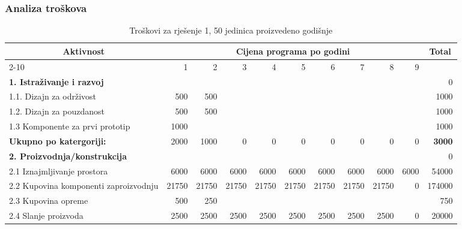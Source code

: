 \documentclass[12pt]{article}
\begin{document}
\subsubsection{Analiza troškova}
\begin{landscape}
\begin{table}[htbp]
  \centering
  \small
  \caption{Troškovi za rješenje 1, 50 jedinica proizvedeno godišnje}
    \begin{tabular}{lrrrrrrrrrr}
    \toprule
    \multicolumn{1}{c}{\multirow{2}[4]{*}{Aktivnost}} & \multicolumn{9}{c}{Cijena programa po godini}                         & \multicolumn{1}{c}{\multirow{2}[4]{*}{Total}} \\
\cmidrule{2-10}          & 1     & 2     & 3     & 4     & 5     & 6     & 7     & 8     & 9     &  \\
    \midrule
    \textbf{1. Istraživanje i razvoj} &       &       &       &       &       &       &       &       &       & 0 \\
    1.1. Dizajn za održivost & 500   & 500   &       &       &       &       &       &       &       & 1000 \\
    1.2. Dizajn za pouzdanost & 500   & 500   &       &       &       &       &       &       &       & 1000 \\
    1.3 Komponente za prvi prototip & 1000  &       &       &       &       &       &       &       &       & 1000 \\
    \midrule
    \textbf{Ukupno po katergoriji:} & 2000  & 1000  & 0     & 0     & 0     & 0     & 0     & 0     & 0     & \textbf{3000} \\
    \midrule
    \textbf{2. Proizvodnja/konstrukcija} &       &       &       &       &       &       &       &       &       & 0 \\
    2.1 Iznajmljivanje prostora & 6000  & 6000  & 6000  & 6000  & 6000  & 6000  & 6000  & 6000  & 6000  & 54000 \\
    \multicolumn{1}{p{14.715em}}{2.2 Kupovina komponenti za\newline{}proizvodnju} & 21750 & 21750 & 21750 & 21750 & 21750 & 21750 & 21750 & 21750 & 0     & 174000 \\
    2.3 Kupovina opreme & 500   & 250   &       &       &       &       &       &       &       & 750 \\
    2.4 Slanje proizvoda & 2500  & 2500  & 2500  & 2500  & 2500  & 2500  & 2500  & 2500  & 0     & 20000 \\
    \midrule

\end{tabular}
\end{table}
\end{landscape}
\end{document}
